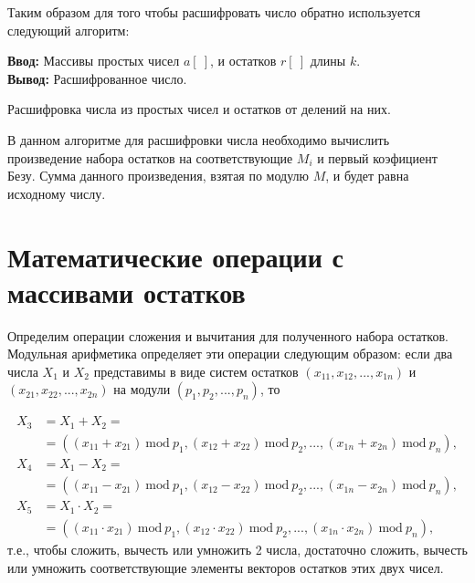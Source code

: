\documentclass[10pt]{article}
\begin{document}
Таким образом для того чтобы расшифровать число обратно используется следующий алгоритм:

\begin{algorithm}[H]
	\textbf{Ввод:} Массивы простых чисел $a[~]$, и остатков $r[~]$ длины $k$.\\
	\textbf{Вывод:} Расшифрованное число.
	\begin{algorithmic}
	\end{algorithmic}
	\caption{Расшифровка числа из простых чисел и остатков от делений на них.}
	\label{algo:crt_decription}
\end{algorithm}

В данном алгоритме для расшифровки числа необходимо вычислить произведение набора остатков на соответствующие $M_i$ и первый коэфициент Безу. Сумма данного произведения, взятая по модулю $M$, и будет равна исходному числу.

\section{Математические операции с массивами остатков}

Определим операции сложения и вычитания для полученного набора остатков. Модульная арифметика \cite{omondi2007residue, soderstrand1986residue} определяет эти операции следующим образом: если два числа $X_1$ и $X_2$ представимы в виде систем остатков $(x_{11}, x_{12}, ..., x_{1n}) $ и $(x_{21}, x_{22}, ..., x_{2n})$ на модули $(p_1, p_2, ..., p_n)$, то 

\begin{align} 
	X_3 &= X_1 + X_2 = \nonumber \\ 
	    & = ((x_{11} + x_{21})\ \mathrm{mod}\ p_1, (x_{12} + x_{22})\ \mathrm{mod}\ p_2, ..., (x_{1n} + x_{2n})\ \mathrm{mod}\ p_n), \\
	X_4 &= X_1 - X_2 = \nonumber \\ 
		& =((x_{11} - x_{21})\ \mathrm{mod}\ p_1, (x_{12} - x_{22})\ \mathrm{mod}\ p_2, ..., (x_{1n} - x_{2n})\ \mathrm{mod}\ p_n), \\
	X_5 &= X_1 \cdot X_2 = \nonumber \\ 
		& = ((x_{11} \cdot x_{21})\ \mathrm{mod}\ p_1, (x_{12} \cdot x_{22})\ \mathrm{mod}\ p_2, ..., (x_{1n} \cdot x_{2n})\ \mathrm{mod}\ p_n), 
\end{align}
т.е., чтобы сложить, вычесть или умножить 2 числа, достаточно сложить, вычесть или умножить соответствующие элементы векторов остатков этих двух чисел. 
\end{document}
